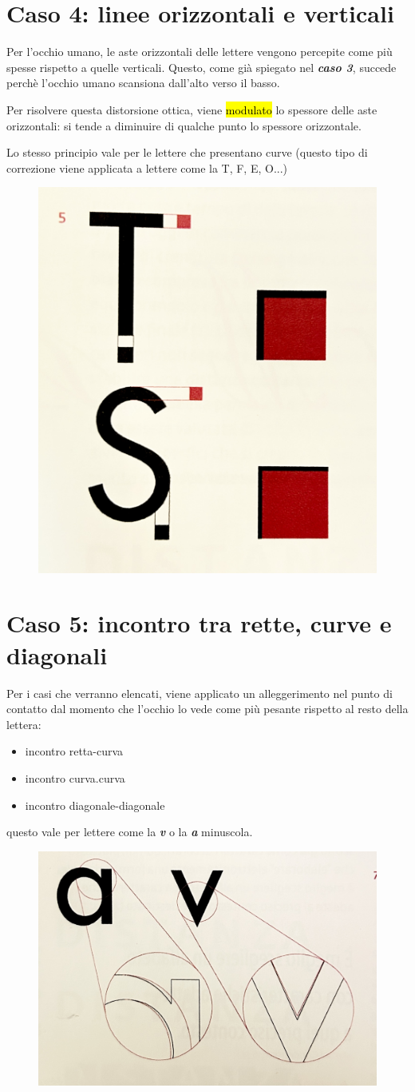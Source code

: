 \section{Caso 4: linee orizzontali e verticali}
Per l'occhio umano, le aste orizzontali delle lettere vengono percepite come più spesse rispetto a quelle verticali. Questo, come già spiegato nel \textit{\textbf{ caso 3}}, succede perchè l'occhio umano scansiona dall'alto verso il basso.

Per risolvere questa distorsione ottica, viene \hl{modulato} lo spessore delle aste orizzontali: si tende a diminuire di qualche punto lo spessore orizzontale.

Lo stesso principio vale per le lettere che presentano curve (questo tipo di correzione viene applicata a lettere come la T, F, E, O...)
\begin{figure}[H]
    \centering
    \includegraphics[width=0.3\linewidth]{blocco_2 - spiegazioni teorico-pratiche/imgs/IMG_4757.jpg}
\end{figure}

\section{Caso 5: incontro tra rette, curve e diagonali}
Per i casi che verranno elencati, viene applicato un alleggerimento nel punto di contatto dal momento che l'occhio lo vede come più pesante rispetto al resto della lettera:
\begin{itemize}
    \item incontro retta-curva
    \item incontro curva.curva
    \item incontro diagonale-diagonale
\end{itemize}
questo vale per lettere come la \textit{\textbf{v}} o la \textbf{\textit{a}} minuscola.
\begin{figure}[H]
    \centering
    \includegraphics[width=0.3\linewidth]{blocco_2 - spiegazioni teorico-pratiche/imgs/IMG_4759.jpg}
\end{figure}

